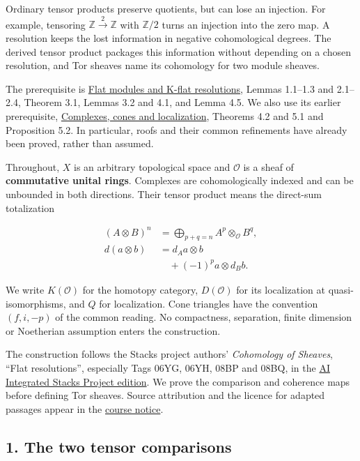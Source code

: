 \documentclass[
  english,
  11pt,
  a4paper,
]{article}
\begin{document}
Ordinary tensor products preserve quotients, but can lose an injection.
For example, tensoring \(\mathbb Z\xrightarrow{2}\mathbb Z\) with
\(\mathbb Z/2\) turns an injection into the zero map. A resolution keeps
the lost information in negative cohomological degrees. The derived
tensor product packages this information without depending on a chosen
resolution, and Tor sheaves name its cohomology for two module sheaves.

The prerequisite is \hyperref[flat-modules-and-k-flat-resolutions]{Flat
modules and K-flat resolutions}, Lemmas 1.1--1.3 and 2.1--2.4, Theorem
3.1, Lemmas 3.2 and 4.1, and Lemma 4.5. We also use its earlier
prerequisite, \hyperref[complexes-cones-and-localization]{Complexes,
cones and localization}, Theorems 4.2 and 5.1 and Proposition 5.2. In
particular, roofs and their common refinements have already been proved,
rather than assumed.

Throughout, \(X\) is an arbitrary topological space and \(\mathcal O\)
is a sheaf of \textbf{commutative unital rings}. Complexes are
cohomologically indexed and can be unbounded in both directions. Their
tensor product means the direct-sum totalization

\[\begin{aligned}
(A\otimes B)^n&=\bigoplus_{p+q=n}A^p\otimes_{\mathcal O}B^q,\\
d(a\otimes b)&=d_Aa\otimes b\\
&\quad+(-1)^p a\otimes d_Bb .
\end{aligned}
\tag{0.1}\]

We write \(K(\mathcal O)\) for the homotopy category, \(D(\mathcal O)\)
for its localization at quasi-isomorphisms, and \(Q\) for localization.
Cone triangles have the convention \((f,i,-p)\) of the common reading.
No compactness, separation, finite dimension or Noetherian assumption
enters the construction.

The construction follows the Stacks project authors' \emph{Cohomology of
Sheaves}, ``Flat resolutions'', especially Tags 06YG, 06YH, 08BP and
08BQ, in the
\href{https://github.com/KokunoYumeto/unofficial-stacks-project-ai-drafts/blob/565b10e987aba5969b21145a0833f42d69f96790/cohomology.tex}{AI
Integrated Stacks Project edition}. We prove the comparison and
coherence maps before defining Tor sheaves. Source attribution and the
licence for adapted passages appear in the
\hyperref[sources-and-authorship]{course notice}.

\subsection{1. The two tensor
comparisons}\label{derived-tensor-products-and-tor-sheaves--1-the-two-tensor-comparisons}
\end{document}
